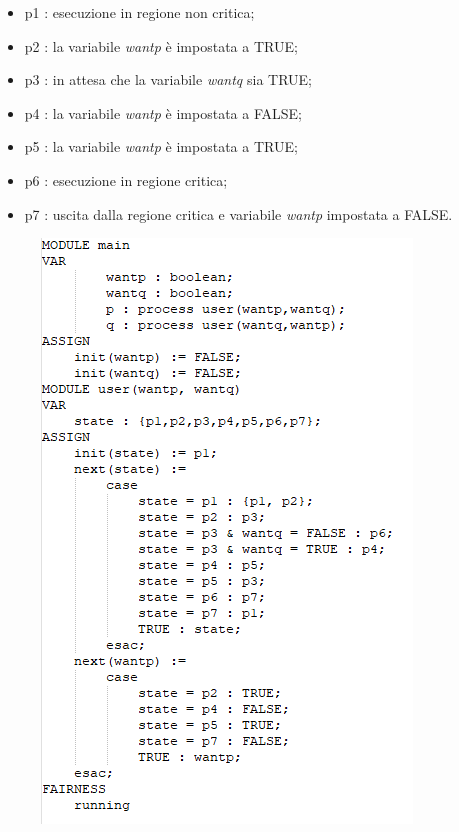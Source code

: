 \documentclass{article}
\begin{document}
\begin{itemize}
    \item p1 : esecuzione in regione non critica;
    \item p2 : la variabile \textit{wantp} è impostata a TRUE;
    \item p3 : in attesa che la variabile \textit{wantq} sia TRUE;
    \item p4 : la variabile \textit{wantp} è impostata a FALSE;
    \item p5 : la variabile \textit{wantp} è impostata a TRUE;
    \item p6 : esecuzione in regione critica;
    \item p7 : uscita dalla regione critica e variabile \textit{wantp} impostata a FALSE.
\end{itemize}
\begin{figure}[h] 
\centering
\includegraphics[scale=0.95]{3.9nusmv.png}
\end{figure}
\end{document}

